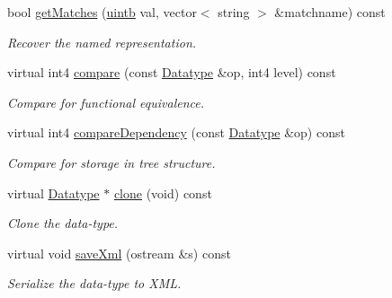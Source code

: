 \begin{DoxyCompactItemize}
bool \mbox{\hyperlink{class_type_enum_a9ea9c9d8c439990a5be5828ec2d9b9fd}{get\+Matches}} (\mbox{\hyperlink{types_8h_a2db313c5d32a12b01d26ac9b3bca178f}{uintb}} val, vector$<$ string $>$ \&matchname) const
\begin{DoxyCompactList}\small\item\em Recover the named representation. \end{DoxyCompactList}\item 
virtual int4 \mbox{\hyperlink{class_type_enum_acf43c87e14ab5b8e128fb35d86059bc5}{compare}} (const \mbox{\hyperlink{class_datatype}{Datatype}} \&op, int4 level) const
\begin{DoxyCompactList}\small\item\em Compare for functional equivalence. \end{DoxyCompactList}\item 
virtual int4 \mbox{\hyperlink{class_type_enum_a593a6c9e7b9c3db7bbb3f590d8f3f202}{compare\+Dependency}} (const \mbox{\hyperlink{class_datatype}{Datatype}} \&op) const
\begin{DoxyCompactList}\small\item\em Compare for storage in tree structure. \end{DoxyCompactList}\item 
virtual \mbox{\hyperlink{class_datatype}{Datatype}} $\ast$ \mbox{\hyperlink{class_type_enum_ac5592c52de3d1ccad25cd9e1e20126d7}{clone}} (void) const
\begin{DoxyCompactList}\small\item\em Clone the data-\/type. \end{DoxyCompactList}\item 
virtual void \mbox{\hyperlink{class_type_enum_a2ad6a825a5a0a83687814c79ec71ebc4}{save\+Xml}} (ostream \&s) const
\begin{DoxyCompactList}\small\item\em Serialize the data-\/type to X\+ML. \end{DoxyCompactList}\end{DoxyCompactItemize}
